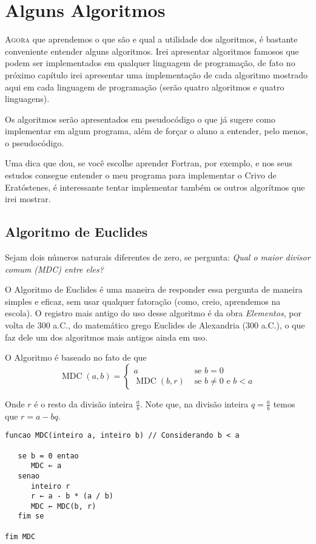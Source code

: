 \chapter{Alguns Algoritmos}

\lettrine{A}{gora} que aprendemos o que são e qual a utilidade dos algoritmos,
é bastante conveniente entender alguns algoritmos. Irei apresentar algoritmos
famosos que podem ser implementados em qualquer linguagem de programação,
de fato no próximo capítulo irei apresentar uma implementação de cada
algoritmo mostrado aqui em cada linguagem de programação
(serão quatro algoritmos e quatro linguagens).

Os algoritmos serão apresentados em pseudocódigo o que já sugere como
implementar em algum programa, além de forçar o aluno a entender, pelo menos,
o pseudocódigo.

Uma dica que dou, se você escolhe aprender Fortran, por exemplo,
e nos seus estudos consegue entender o meu programa para implementar o
Crivo de Eratóstenes, é interessante tentar implementar também os outros
algorítmos que irei mostrar.





\section{Algoritmo de Euclides}

Sejam dois números naturais diferentes de zero, se pergunta:
\textit{Qual o maior divisor comum (MDC) entre eles?}

O Algoritmo de Euclides é uma maneira de responder essa pergunta
de maneira simples e eficaz, sem usar qualquer fatoração (como, creio, aprendemos na escola).
O registro mais antigo do uso desse algoritmo é da obra
\textit{Elementos}, por volta de 300 a.C., do matemático grego Euclides de Alexandria (300 a.C.),
o que faz dele um dos algoritmos mais
antigos ainda em uso.

O Algoritmo é baseado no fato de que
\[
\operatorname{MDC}(a, b) =
\left\{
\begin{aligned}
a & \text{~se~} b = 0 \\
\operatorname{MDC}(b, r) & \text{~se~} b \neq 0 \text{~e~} b < a
\end{aligned}\right.
\]

\noindent
Onde $r$ é o resto da divisão inteira $\frac{a}{b}$.
Note que, na divisão inteira $q = \frac{a}{b}$ temos que
$r = a - b q$.

\begin{lstlisting}[style=pseudo]
funcao MDC(inteiro a, inteiro b) // Considerando b < a

   se b = 0 entao
      MDC ← a
   senao
      inteiro r
      r ← a - b * (a / b)
      MDC ← MDC(b, r)
   fim se
      
fim MDC
\end{lstlisting}

